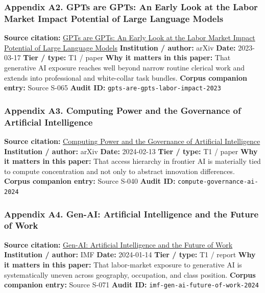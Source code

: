\documentclass[
  american,
  11pt,
  letterpaper,
]{article}
\begin{document}
\subsubsection{Appendix A2. GPTs are GPTs: An Early Look at the Labor
Market Impact Potential of Large Language
Models}\label{ch-09-appendix-a2-gpts-are-gpts-an-early-look-at-the-labor-market-impact-potential-of-large-language-models}

\textbf{Source citation:} \href{https://arxiv.org/abs/2303.10130}{GPTs
are GPTs: An Early Look at the Labor Market Impact Potential of Large
Language Models} \textbf{Institution / author:} arXiv \textbf{Date:}
2023-03-17 \textbf{Tier / type:} T1 / paper \textbf{Why it matters in
this paper:} That generative AI exposure reaches well beyond narrow
routine clerical work and extends into professional and white-collar
task bundles. \textbf{Corpus companion entry:} Source S-065
\textbf{Audit ID:} \texttt{gpts-are-gpts-labor-impact-2023}

\subsubsection{Appendix A3. Computing Power and the Governance of
Artificial
Intelligence}\label{ch-09-appendix-a3-computing-power-and-the-governance-of-artificial-intelligence}

\textbf{Source citation:}
\href{https://arxiv.org/abs/2402.08797}{Computing Power and the
Governance of Artificial Intelligence} \textbf{Institution / author:}
arXiv \textbf{Date:} 2024-02-13 \textbf{Tier / type:} T1 / paper
\textbf{Why it matters in this paper:} That access hierarchy in frontier
AI is materially tied to compute concentration and not only to abstract
innovation differences. \textbf{Corpus companion entry:} Source S-040
\textbf{Audit ID:} \texttt{compute-governance-ai-2024}

\subsubsection{Appendix A4. Gen-AI: Artificial Intelligence and the
Future of
Work}\label{ch-09-appendix-a4-gen-ai-artificial-intelligence-and-the-future-of-work}

\textbf{Source citation:}
\href{https://www.imf.org/en/publications/staff-discussion-notes/issues/2024/01/14/gen-ai-artificial-intelligence-and-the-future-of-work-542379}{Gen-AI:
Artificial Intelligence and the Future of Work} \textbf{Institution /
author:} IMF \textbf{Date:} 2024-01-14 \textbf{Tier / type:} T1 / report
\textbf{Why it matters in this paper:} That labor-market exposure to
generative AI is systematically uneven across geography, occupation, and
class position. \textbf{Corpus companion entry:} Source S-071
\textbf{Audit ID:} \texttt{imf-gen-ai-future-of-work-2024}
\end{document}
